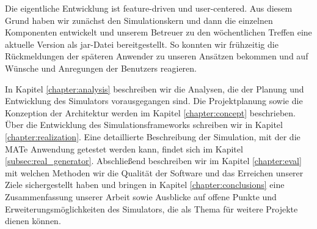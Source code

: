 Die eigentliche Entwicklung ist feature-driven und user-centered. Aus diesem Grund haben wir zunächst den Simulationskern und dann die einzelnen Komponenten entwickelt und unserem Betreuer zu den wöchentlichen Treffen eine aktuelle Version als jar-Datei bereitgestellt. So konnten wir frühzeitig die Rückmeldungen der späteren Anwender zu unseren Ansätzen bekommen und auf Wünsche und Anregungen der Benutzers reagieren.



In Kapitel \ref{chapter:analysis} beschreiben wir die Analysen, die der Planung und Entwicklung des Simulators vorausgegangen sind.
Die Projektplanung sowie die Konzeption der Architektur werden im Kapitel \ref{chapter:concept} beschrieben.
Über die Entwicklung des Simulationsframeworks schreiben wir in Kapitel \ref{chapter:realization}.
Eine detaillierte Beschreibung der Simulation, mit der die MATe Anwendung getestet werden kann, findet sich im Kapitel \ref{subsec:real_generator}.
Abschließend beschreiben wir im Kapitel \ref{chapter:eval} mit welchen Methoden wir die Qualität der Software und das Erreichen unserer Ziele sichergestellt haben und bringen in Kapitel \ref{chapter:conclusions} eine Zusammenfassung unserer Arbeit sowie Ausblicke auf offene Punkte und Erweiterungsmöglichkeiten des Simulators, die als Thema für weitere Projekte dienen können.


